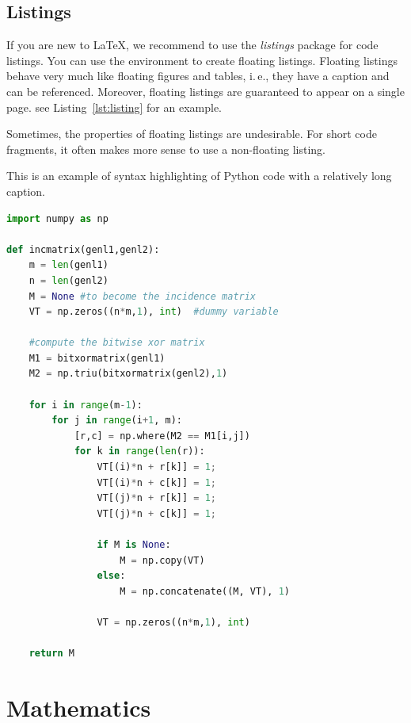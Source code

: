 \subsection{Listings}

If you are new to LaTeX, we recommend to use the \emph{listings} package for code listings. You can use the environment  to create floating listings. Floating listings behave very much like floating figures and tables, i.\,e., they have a caption and can be referenced. Moreover, floating listings are guaranteed to appear on a single page. see Listing~\ref{lst:listing} for an example.

Sometimes, the properties of floating listings are undesirable. For short code fragments, it often makes more sense to use a non-floating listing.

\begin{lstfloat}
\caption{\label{lst:listing} This is an example of syntax highlighting of Python code with a relatively long caption.}
\begin{lstlisting}[language=Python]
import numpy as np
 
def incmatrix(genl1,genl2):
    m = len(genl1)
    n = len(genl2)
    M = None #to become the incidence matrix
    VT = np.zeros((n*m,1), int)  #dummy variable
 
    #compute the bitwise xor matrix
    M1 = bitxormatrix(genl1)
    M2 = np.triu(bitxormatrix(genl2),1) 
 
    for i in range(m-1):
        for j in range(i+1, m):
            [r,c] = np.where(M2 == M1[i,j])
            for k in range(len(r)):
                VT[(i)*n + r[k]] = 1;
                VT[(i)*n + c[k]] = 1;
                VT[(j)*n + r[k]] = 1;
                VT[(j)*n + c[k]] = 1;
 
                if M is None:
                    M = np.copy(VT)
                else:
                    M = np.concatenate((M, VT), 1)
 
                VT = np.zeros((n*m,1), int)
 
    return M
\end{lstlisting}
\end{lstfloat}


\section{Mathematics}

